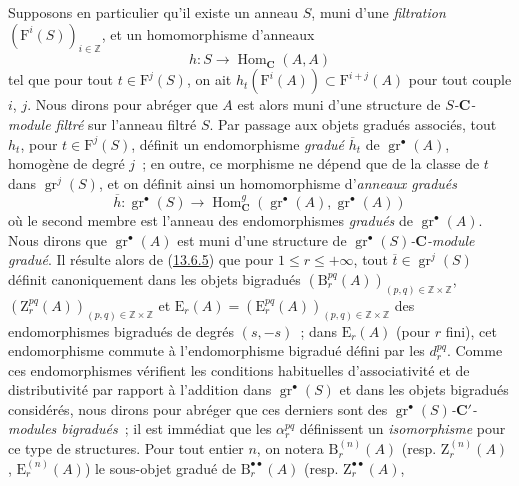 \begin{env}[13.6.6]
\label{0.13.6.6-fr}
Supposons en particulier qu'il existe un anneau $S$, muni d'une
\emph{filtration} $(\mathrm F^i(S))_{i\in\mathbb Z}$, et un homomorphisme
d'anneaux
\begin{equation}
\label{0.13.6.6.1-fr}
\tag{13.6.6.1}
h:S\to\operatorname{Hom}_{\boldsymbol{C}}(A,A)
\end{equation}
tel que pour tout $t\in\mathrm F^j(S)$, on ait
$h_t(\mathrm F^i(A))\subset\mathrm F^{i+j}(A)$ pour tout couple $i$,
$j$. Nous dirons pour abréger que $A$ est alors muni d'une structure de
\emph{$S$-$\boldsymbol{C}$-module filtré} sur l'anneau filtré $S$. Par passage aux
objets gradués associés, tout $h_t$, pour $t\in\mathrm F^j(S)$, définit
un endomorphisme \emph{gradué} $\overline h_t$ de
$\operatorname{gr}^\bullet(A)$, homogène de degré $j$~; en outre, ce
morphisme ne dépend que de la classe de $t$ dans
$\operatorname{gr}^j(S)$, et on définit ainsi un homomorphisme d'\emph{anneaux
gradués}
\[
\overline h:\operatorname{gr}^\bullet(S)\to
\operatorname{Hom}_{\boldsymbol{C}}^g(\operatorname{gr}^\bullet(A),
\operatorname{gr}^\bullet(A))
\]
où le second membre est l'anneau des endomorphismes \emph{gradués} de
$\operatorname{gr}^\bullet(A)$. Nous dirons que
$\operatorname{gr}^\bullet(A)$ est muni d'une structure de
\emph{$\operatorname{gr}^\bullet(S)$-$\boldsymbol{C}$-module gradué}. Il résulte alors
de (\hyperref[0.13.6.5-fr]{13.6.5}) que pour
$1\leq r\leq+\infty$, tout
$\overline t\in\operatorname{gr}^j(S)$ définit canoniquement dans les
objets bigradués
$(\mathrm B_r^{pq}(A))_{(p,q)\in\mathbb Z\times\mathbb Z}$,
$(\mathrm Z_r^{pq}(A))_{(p,q)\in\mathbb Z\times\mathbb Z}$ et
$\mathrm E_r(A)=(\mathrm E_r^{pq}(A))_{(p,q)\in\mathbb Z\times\mathbb Z}$
des endomorphismes bigradués de degrés $(s,-s)$~; dans
$\mathrm E_r(A)$ (pour $r$ fini), cet endomorphisme commute à
l'endomorphisme bigradué défini par les $d_r^{pq}$. Comme ces
endomorphismes vérifient les conditions habituelles d'associativité et
de distributivité par rapport à l'addition dans
$\operatorname{gr}^\bullet(S)$ et dans les objets bigradués considérés,
nous dirons pour abréger que ces derniers sont des
\emph{$\operatorname{gr}^\bullet(S)$-$\boldsymbol{C}'$-modules bigradués}~; il est
immédiat que les $\alpha_r^{pq}$ définissent un \emph{isomorphisme} pour ce type
de structures. Pour tout entier $n$, on notera
$\mathrm B_r^{(n)}(A)$ (resp. $\mathrm Z_r^{(n)}(A)$,
$\mathrm E_r^{(n)}(A)$) le sous-objet gradué de
$\mathrm B_r^{\bullet\bullet}(A)$ (resp. $\mathrm Z_r^{\bullet\bullet}(A)$,

\end{env}
